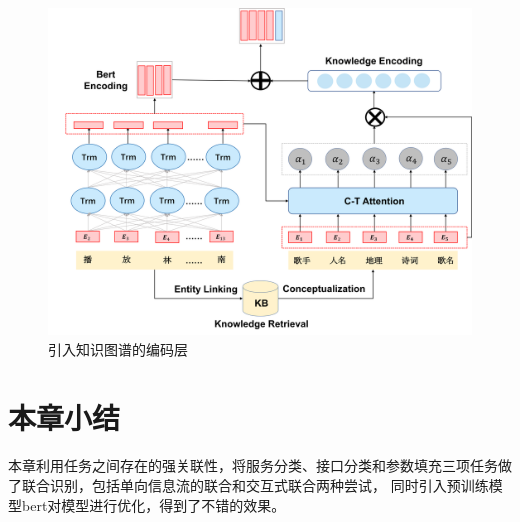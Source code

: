 \begin{figure}[htbp]
  \centering
  \includegraphics[width=16cm]{./images/kg.png}
  \caption{引入知识图谱的编码层}
  \label{fig:kg}
\end{figure}

\section{本章小结}
本章利用任务之间存在的强关联性，将服务分类、接口分类和参数填充三项任务做了联合识别，包括单向信息流的联合和交互式联合两种尝试，
同时引入预训练模型bert对模型进行优化，得到了不错的效果。
